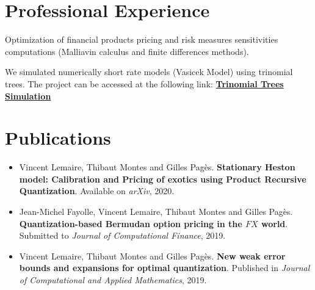 \documentclass[]{deedy-resume-openfont}
\begin{document}
\begin{minipage}[t]{0.66\textwidth}
	\vspace{\topsep}
	\vspace{\topsep}
	\section{Professional Experience}


	Optimization of financial products pricing and risk measures sensitivities computations (Malliavin calculus and finite differences methods).
	\sectionsep

	We simulated numerically short rate models (Vasicek Model) using trinomial trees. The project can be accessed at the following link: \href{http://simulations.lpsm.paris/trinomial_trees/}{\bf Trinomial Trees Simulation}
	\sectionsep


	\vspace{\topsep}

	\section{Publications}

	\begin{itemize}
		\item Vincent Lemaire, Thibaut Montes and Gilles Pagès. \textbf{Stationary Heston model: Calibration and Pricing of exotics using Product Recursive Quantization}. Available on \textit{arXiv}, 2020.
		\item Jean-Michel Fayolle, Vincent Lemaire, Thibaut Montes and Gilles Pagès. \textbf{Quantization-based Bermudan option pricing in the $FX$ world}. Submitted to \textit{Journal of Computational Finance}, 2019.
		\item Vincent Lemaire, Thibaut Montes and Gilles Pagès. \textbf{New weak error bounds and expansions for optimal quantization}. Published in \textit{Journal of Computational and Applied Mathematics}, 2019.
	\end{itemize}

	\vspace{-1.cm}
	\renewcommand\refname{\vskip -1.5em} %
	
	
	\nocite{*}


\end{minipage}
%
% 
% 
\end{document}
